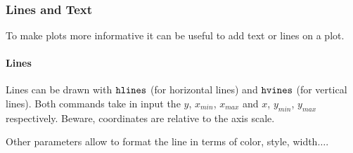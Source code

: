     \begin{center}
    \end{center}
    { \hspace*{\fill} \\}
    
    \hypertarget{lines-and-text}{%
\subsubsection{Lines and Text}\label{lines-and-text}}

To make plots more informative it can be useful to add text or lines on
a plot.

\hypertarget{lines}{%
\paragraph{Lines}\label{lines}}

Lines can be drawn with \(\tt{hlines}\) (for horizontal lines) and
\(\tt{hvines}\) (for vertical lines). Both commands take in input the
\(y\), \(x_{min}\), \(x_{max}\) and \(x\), \(y_{min}\), \(y_{max}\)
respectively. Beware, coordinates are relative to the axis scale.

Other parameters allow to format the line in terms of color, style,
width\(\ldots\).


